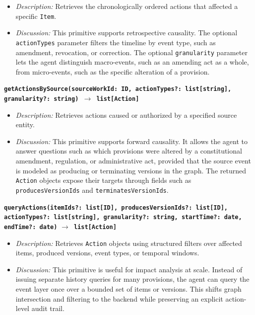 \documentclass[11pt]{article}
\begin{document}
\begin{itemize}
    \item \textit{Description:} Retrieves the chronologically ordered actions that affected a specific \texttt{Item}.
    \item \textit{Discussion:} This primitive supports retrospective causality. The optional \texttt{actionTypes} parameter filters the timeline by event type, such as amendment, revocation, or correction. The optional \texttt{granularity} parameter lets the agent distinguish macro-events, such as an amending act as a whole, from micro-events, such as the specific alteration of a provision.
\end{itemize}

\vspace{0.3cm}
\noindent\textbf{\texttt{getActionsBySource(sourceWorkId: ID, actionTypes?: list[string],}} \newline
\textbf{\texttt{granularity?: string) $\rightarrow$ list[Action]}}

\begin{itemize}
    \item \textit{Description:} Retrieves actions caused or authorized by a specified source entity.
    \item \textit{Discussion:} This primitive supports forward causality. It allows the agent to answer questions such as which provisions were altered by a constitutional amendment, regulation, or administrative act, provided that the source event is modeled as producing or terminating versions in the graph. The returned \texttt{Action} objects expose their targets through fields such as \texttt{producesVersionIds} and \texttt{terminatesVersionIds}.
\end{itemize}

\vspace{0.3cm}
\noindent\textbf{\texttt{queryActions(itemIds?: list[ID], producesVersionIds?: list[ID],}} \newline
\textbf{\texttt{actionTypes?: list[string], granularity?: string,
\newline
startTime?: date, endTime?: date)}} \textbf{\texttt{$\rightarrow$ list[Action]}}

\begin{itemize}
    \item \textit{Description:} Retrieves \texttt{Action} objects using structured filters over affected items, produced versions, event types, or temporal windows.
    \item \textit{Discussion:} This primitive is useful for impact analysis at scale. Instead of issuing separate history queries for many provisions, the agent can query the event layer once over a bounded set of items or versions. This shifts graph intersection and filtering to the backend while preserving an explicit action-level audit trail.
\end{itemize}
\end{document}

